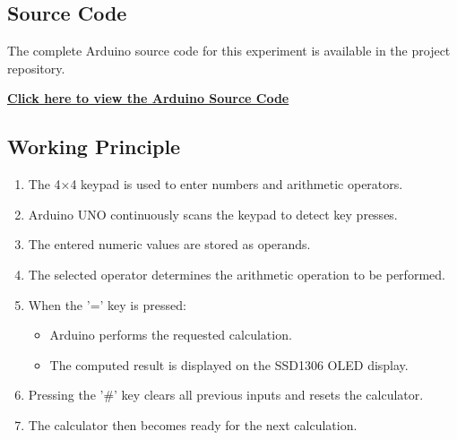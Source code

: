 \subsection{Source Code}

The complete Arduino source code for this experiment is available in the project repository.

\href{https://github.com/YOUR_USERNAME/YOUR_REPOSITORY/blob/main/Exp-2/calculator/calculator.ino}
{\textbf{Click here to view the Arduino Source Code}}


\subsection{Working Principle}

\begin{enumerate}

\item The 4×4 keypad is used to enter numbers and arithmetic operators.

\item Arduino UNO continuously scans the keypad to detect key presses.

\item The entered numeric values are stored as operands.

\item The selected operator determines the arithmetic operation to be performed.

\item When the '=' key is pressed:

\begin{itemize}
    \item Arduino performs the requested calculation.
    \item The computed result is displayed on the SSD1306 OLED display.
\end{itemize}

\item Pressing the '\#' key clears all previous inputs and resets the calculator.

\item The calculator then becomes ready for the next calculation.

\end{enumerate}



